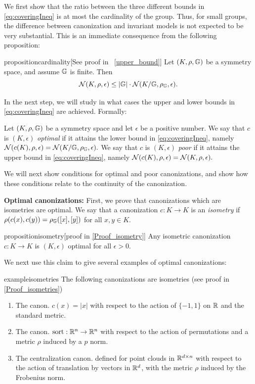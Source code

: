 We first show that the ratio between the three different bounds in \ref{eq:coveringIneq} is at most the cardinality of the group. Thus, for small groups, the difference between canonization and invariant models is not expected to be very substantial. This is an immediate consequence from the following proposition:
\begin{restatable}{proposition}{cardinality}[See proof in ~\ref{upper_bound}]
\label{prop:cardinality}
Let $(K,\rho,\mathbb{G})$ be a symmetry space, and assume $\mathbb{G}$ is finite. Then
\[
\mathcal{N}(K,\rho,\epsilon)\le |\mathbb{G}|\cdot \mathcal{N}(K/\mathbb{G},\rho_{\mathbb{G}},\epsilon).
\]
\end{restatable}

In the next step, we will study in what cases the upper and lower bounds in \eqref{eq:coveringIneq} are achieved. Formally:
\begin{definition}
Let $(K,\rho,\mathbb{G})$ be a symmetry space and let $\epsilon$ be a positive number. We say that $c$ is $(K,\epsilon) $ \emph{optimal} if it attains the lower bound in \eqref{eq:coveringIneq}, namely
$
\mathcal{N}(c(K),\rho,\epsilon) = \mathcal{N}(K/\mathbb{G},\rho_{\mathbb{G}},\epsilon).
$
We say that $c$ is $(K,\epsilon) $ \emph{poor}  if it attains the upper bound in \eqref{eq:coveringIneq}, namely
$
\mathcal{N}(c(K),\rho,\epsilon)=\mathcal{N}(K,\rho,\epsilon).
$
\end{definition}
We will next show conditions for optimal and poor canonizations, and show how these conditions relate to the continuity of the canonization.

\textbf{Optimal canonizations:}
First, we prove that canonizations which are isometries are optimal. We say that a canonization $c:K\to K $ is an \emph{isometry} if $\rho(c(x),c(y))=\rho_{\mathbb{G}}([x],[y])  $ for all $x,y\in K$.
\begin{restatable}{proposition}{isometry}\label{prop:isometry}[proof in \ref{Proof_isometry}]
    Any isometric canonization $c:K\to K$ is $(K,\epsilon) $ optimal for all $\epsilon>0$.
\end{restatable}

We next use this claim to give several examples of  optimal canonizations:
\begin{restatable}{example}{isometries}\label{prop:isometries}
    The following canonizations are isometries (see proof in \ref{Proof_isometries})
\begin{enumerate}
\item The canon. $c(x)=|x|$ with respect to the action of $\{-1,1\} $ on $\mathbb{R}$ and the standard metric.
\item The canon. $\mathrm{sort}:\mathbb{R}^n \to \mathbb{R}^n $ with respect to the action of permutations and a metric $\rho$ induced by a $p$ norm.
\item The centralization canon. defined for point clouds in $\mathbb{R}^{d\times n}$ with respect to the action of translation by vectors in $\mathbb{R}^d$, with the metric $\rho$ induced by the Frobenius norm.
\end{enumerate}
\end{restatable}

